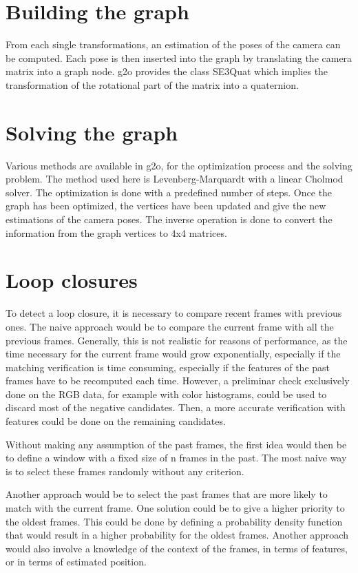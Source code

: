 \section{Building the graph}

From each single transformations, an estimation of the poses of the camera can be computed. Each pose is then inserted into the graph by translating the camera matrix into a graph node. g2o provides the class SE3Quat which implies the transformation of the rotational part of the matrix into a quaternion.

\section{Solving the graph}

Various methods are available in g2o, for the optimization process and the solving problem. The method used here is Levenberg-Marquardt with a linear Cholmod solver. The optimization is done with a predefined number of steps. Once the graph has been optimized, the vertices have been updated and give the new estimations of the camera poses. The inverse operation is done to convert the information from the graph vertices to 4x4 matrices.

\section{Loop closures}

To detect a loop closure, it is necessary to compare recent frames with previous ones. The naive approach would be to compare the current frame with all the previous frames. Generally, this is not realistic for reasons of performance, as the time necessary for the current frame would grow exponentially, especially if the matching verification is time consuming, especially if the features of the past frames have to be recomputed each time. However, a preliminar check exclusively done on the RGB data, for example with color histograms, could be used to discard most of the negative candidates. Then, a more accurate verification with features could be done on the remaining candidates.

Without making any assumption of the past frames, the first idea would then be to define a window with a fixed size of n frames in the past. The most naive way is to select these frames randomly without any criterion.

Another approach would be to select the past frames that are more likely to match with the current frame. One solution could be to give a higher priority to the oldest frames. This could be done by defining a probability density function that would result in a higher probability for the oldest frames. Another approach would also involve a knowledge of the context of the frames, in terms of features, or in terms of estimated position.

